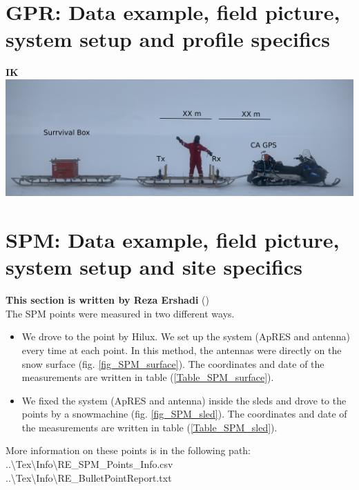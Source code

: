 \documentclass[a4paper,12pt]{article}
\begin{document}
\section{GPR: Data example, field picture, system setup and profile specifics}
\label{SecGpr}
\textbf{IK}
\includegraphics[width=\textwidth]{Figures/PulseEkko/RadarSetup.png}
\pagebreak
\section{SPM: Data example, field picture, system setup and site specifics}
\label{SecSPM}
\textbf{This section is written by Reza Ershadi}
(\href{mailto:mohammadreza.ershadi@uni-tuebingen.de}{\color{blue}{Email Me}})\\

The SPM points were measured in two different ways.
\begin{itemize}
\item We drove to the point by
Hilux. We set up the system (ApRES and antenna) every time at each point. In
this method, the antennas were directly on the snow surface (fig. \ref{fig_SPM_surface}). The
coordinates and date of the measurements are written in table (\ref{Table_SPM_surface}).
\item We fixed the system (ApRES and antenna) inside the sleds and drove to the points by a
snowmachine (fig. \ref{fig_SPM_sled}). The coordinates and date of the measurements are written in
table (\ref{Table_SPM_sled}).
\end{itemize}
More information on these points is in the following path:\\
..\textbackslash Tex\textbackslash Info\textbackslash RE\_SPM\_Points\_Info.csv\\
..\textbackslash Tex\textbackslash Info\textbackslash RE\_BulletPointReport.txt
\end{document}
